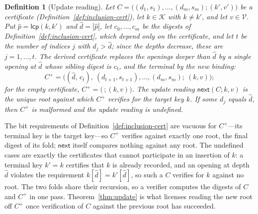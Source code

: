\documentclass[11pt]{article}
\newtheorem{definition}{Definition}
\begin{document}
\begin{definition}[Update reading]
\label{def:update-read}
Let $C = \bigl((d_1,s_1),\ldots,(d_m,s_m);(k',v')\bigr)$ be a certificate (Definition~\ref{def:inclusion-cert}), let $k \in \mathcal{K}$ with $k \neq k'$, and let $v \in \mathcal{V}$. Put $\hat p = \mathsf{lcp}(k,k')$ and $\hat d = |\hat p|$, let $c_0,\ldots,c_m$ be the digests of Definition~\ref{def:inclusion-cert}, which depend only on the certificate, and let $t$ be the number of indices $j$ with $d_j > \hat d$; since the depths decrease, these are $j = 1,\ldots,t$. The \emph{derived certificate} replaces the openings deeper than $\hat d$ by a single opening at $\hat d$ whose sibling digest is $c_t$, and the terminal by the new binding:
\[
  C^{+} = \bigl((\hat d,\,c_t),\ (d_{t+1},s_{t+1}),\ldots,(d_m,s_m);\ (k,v)\bigr);
\]
for the empty certificate, $C^{+} = \bigl(\,;(k,v)\bigr)$. The \emph{update reading} $\mathsf{next}(C;k,v)$ is the unique root against which $C^{+}$ verifies for the target key $k$. If some $d_j$ equals $\hat d$, then $C^{+}$ is malformed and the update reading is undefined.
\end{definition}

The bit requirements of Definition~\ref{def:inclusion-cert} are vacuous for $C^{+}$---its terminal key is the target key---so $C^{+}$ verifies against exactly one root, the final digest of its fold; $\mathsf{next}$ itself compares nothing against any root. The undefined cases are exactly the certificates that cannot participate in an insertion of $k$: a terminal key $k' = k$ certifies that $k$ is already recorded, and an opening at depth $\hat d$ violates the requirement $k[\hat d] = k'[\hat d]$, so such a $C$ verifies for $k$ against no root. The two folds share their recursion, so a verifier computes the digests of $C$ and $C^{+}$ in one pass. Theorem~\ref{thm:update} is what licenses reading the new root off $C^{+}$ once verification of $C$ against the previous root has succeeded.
\end{document}
